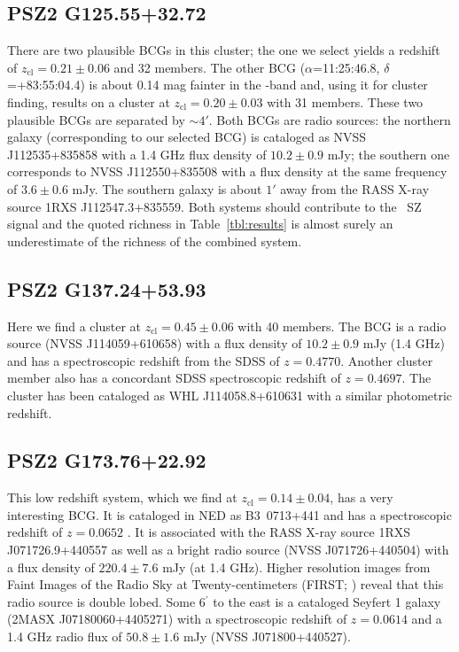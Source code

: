 \documentclass[apj, revtex4-1]{emulateapj}
\begin{document}

\subsection{PSZ2 G125.55+32.72} %
There are two plausible BCGs in this cluster; the one we select yields a redshift of $z_\mathrm{cl} = 0.21 \pm 0.06$ and 32 members. The other BCG ($\alpha$=11:25:46.8, $\delta$=+83:55:04.4) is about 0.14 mag fainter in the \sdssi-band and, using it for cluster finding, results on a cluster at $z_\mathrm{cl} = 0.20 \pm 0.03$ with 31 members. These two plausible BCGs are separated by $\sim4'$. Both BCGs are radio sources: the northern galaxy (corresponding to our selected BCG) is cataloged as NVSS J112535+835858 with a 1.4 GHz flux density of $10.2 \pm 0.9$ mJy; the southern one corresponds to NVSS J112550+835508 with a flux density at the same frequency of $3.6 \pm 0.6$ mJy. The southern galaxy is about $1'$ away from the RASS X-ray source 1RXS J112547.3+835559. Both systems should contribute to the \planck\ SZ signal and the quoted richness in Table~\ref{tbl:results} is almost surely an underestimate of the richness of the combined system.


\subsection{PSZ2 G137.24+53.93} %
Here we find a cluster at $z_\mathrm{cl} = 0.45 \pm 0.06$ with 40 members. The BCG is a radio source (NVSS J114059+610658) with a flux density of $10.2 \pm 0.9$ mJy (1.4 GHz) and has a spectroscopic redshift from the SDSS of $z=0.4770$. Another cluster member also has a concordant SDSS spectroscopic redshift of $z=0.4697$. The cluster has been cataloged as WHL J114058.8+610631 with a similar photometric redshift.

\subsection{PSZ2 G173.76+22.92} %
This low redshift system, which we find at $z_\mathrm{cl} = 0.14 \pm 0.04$, has a very interesting BCG. It is cataloged in NED as \hbox{B3 0713+441} and has a spectroscopic redshift of $z=0.0652$ \citep{Bauer2000}. It is associated with the RASS X-ray source 1RXS J071726.9+440557 as well as a bright radio source (NVSS J071726+440504) with a flux density of $220.4\pm 7.6$ mJy (at 1.4 GHz). Higher resolution images from Faint Images of the Radio Sky at Twenty-centimeters (FIRST; \citealt{Becker1995}) reveal that this radio source is double lobed. Some 6$^\prime$ to the east is a cataloged Seyfert 1 galaxy (2MASX J07180060+4405271) with a spectroscopic redshift of $z=0.0614$ \citep{Michel1988} and a 1.4 GHz radio flux of $50.8 \pm 1.6 $ mJy (NVSS J071800+440527).
\end{document}
